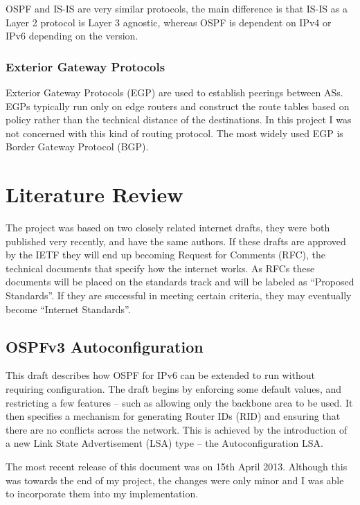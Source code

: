 \documentclass[12pt,a4paper,twoside]{report}
\begin{document}
OSPF and IS-IS are very similar protocols, the main difference is that IS-IS as
a Layer 2 protocol is Layer 3 agnostic, whereas OSPF is dependent on IPv4 or
IPv6 depending on the version.

\subsection{Exterior Gateway Protocols}
Exterior Gateway Protocols (EGP) 
are used to establish peerings between ASs. EGPs typically run only on edge
routers and construct the route tables based on policy rather than the
technical distance of the destinations. In this project I was not concerned
with this kind of routing protocol.  The most widely used EGP is Border
Gateway Protocol (BGP).



\chapter{Literature Review} 
The project was based on two closely related internet drafts, they were both
published very recently, and have the same authors. If these drafts are
approved by the IETF they will end up becoming Request for Comments
(RFC), the technical documents that
specify how the internet works. As RFCs these documents will be placed on the
standards track and will be labeled as ``Proposed Standards''. If they are
successful in meeting certain criteria, they may eventually become ``Internet
Standards''\cite{rfc6410}.

\section{OSPFv3 Autoconfiguration}
This draft\cite{draft-ietf-ospf-ospfv3-autoconfig-02} describes how OSPF for
IPv6 can be extended to run without requiring configuration. The draft begins
by enforcing some default values, and restricting a few features -- such as
allowing only the backbone area to be used. It then specifies a mechanism for
generating Router IDs (RID)  and ensuring that
there are no conflicts across the network. This is achieved by the introduction
of a new Link State Advertisement (LSA)  type -- the Autoconfiguration LSA. 

The most recent release of this document was on 15th April 2013. Although this
was towards the end of my project, the changes were only minor and I was able
to incorporate them into my implementation.
\end{document}
